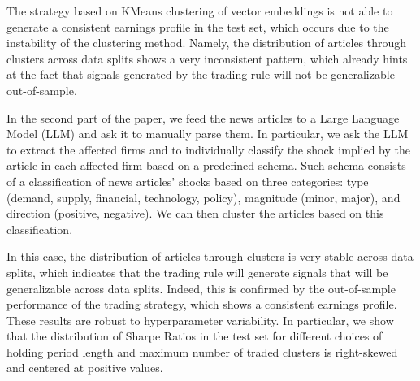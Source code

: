 \mx 
The strategy based on KMeans clustering of vector embeddings is not able to generate a consistent earnings profile in the test set, which occurs due to the instability of the clustering method. Namely, the distribution of articles through clusters across data splits shows a very inconsistent pattern, which already hints at the fact that signals generated by the trading rule will not be generalizable out-of-sample.

\mx 
In the second part of the paper, we feed the news articles to a Large Language Model (LLM) and ask it to manually parse them. In particular, we ask the LLM to extract the affected firms and to individually classify the shock implied by the article in each affected firm based on a predefined schema. Such schema consists of a classification of news articles' shocks based on three categories: type (demand, supply, financial, technology, policy), magnitude (minor, major), and direction (positive, negative). We can then cluster the articles based on this classification. 

\mx
In this case, the distribution of articles through clusters is very stable across data splits, which indicates that the trading rule will generate signals that will be generalizable across data splits. Indeed, this is confirmed by the out-of-sample performance of the trading strategy, which shows a consistent earnings profile. These results are robust to hyperparameter variability. In particular, we show that the distribution of Sharpe Ratios in the test set for different choices of holding period length and maximum number of traded clusters is right-skewed and centered at positive values.




